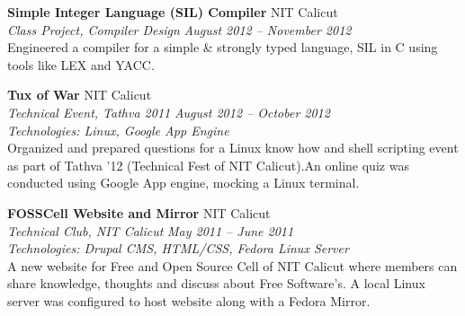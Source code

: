 \documentclass[margin,line]{resume}
\begin{document}
\begin{resume}
	   \textbf{Simple Integer Language (SIL) Compiler} 						\hfill NIT Calicut \\
    \textit{Class Project, Compiler Design} 							\hfill \textit{August 2012 -- November 2012}\\
	Engineered a compiler for a simple \& strongly typed language, SIL in C using tools like LEX and YACC.
   \vspace{2mm}%
   
   
   
    
    \textbf{Tux of War} 								\hfill NIT Calicut \\
    \textit{Technical Event, Tathva 2011} 							\hfill \textit{August 2012 -- October 2012}\\
    \textit{Technologies: Linux, Google App Engine} \\
   Organized and prepared questions for a Linux know how and shell scripting event as part of Tathva ’12 (Technical Fest of NIT      Calicut).An online quiz was conducted using Google App engine, mocking a Linux terminal.
      \vspace{2mm}%
      
      
    \textbf{FOSSCell Website and Mirror} 						\hfill NIT Calicut \\
    \textit{Technical Club, NIT Calicut} 							\hfill \textit{May 2011 -- June 2011}\\
    \textit{Technologies: Drupal CMS, HTML/CSS, Fedora Linux Server} \\
	A new website for Free and Open Source Cell of NIT Calicut where members can share knowledge,
thoughts and discuss about Free Software’s. A local Linux server was configured to host website
along with a Fedora Mirror.
   

%
%   
%	
%	
   
\pagebreak


\end{resume}
\end{document}
